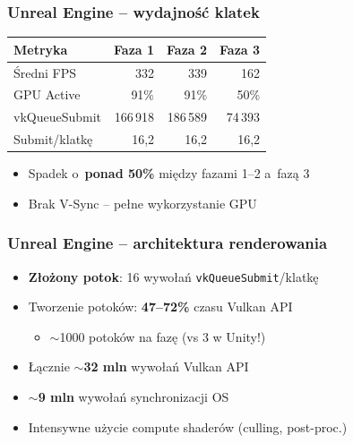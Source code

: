 \documentclass{beamer}
\begin{document}
\begin{frame}
  \frametitle{Unreal Engine -- wydajność klatek}
  \begin{table}
    \centering
    \small
    \begin{tabular}{lrrr}
      \toprule
      \textbf{Metryka} & \textbf{Faza 1} & \textbf{Faza 2} & \textbf{Faza 3} \\
      \midrule
      Średni FPS & 332 & 339 & 162  \\
      GPU Active & 91\% & 91\% & 50\% \\
      vkQueueSubmit & 166\,918 & 186\,589 & 74\,393 \\
      Submit/klatkę & 16,2 & 16,2 & 16,2  \\
      \bottomrule
    \end{tabular}
  \end{table}
  \vspace{0.3cm}
  \begin{itemize}
    \item Spadek o~\textbf{ponad 50\%} między fazami 1--2 a~fazą 3
    \item Brak V-Sync -- pełne wykorzystanie GPU
  \end{itemize}
\end{frame}

\begin{frame}
  \frametitle{Unreal Engine -- architektura renderowania}
  \small
  \begin{itemize}
    \item \textbf{Złożony potok}: 16 wywołań \texttt{vkQueueSubmit}/klatkę
    \item Tworzenie potoków: \textbf{47--72\%} czasu Vulkan API
    \begin{itemize}
      \item $\sim$1000 potoków na fazę (vs 3 w Unity!)
    \end{itemize}
    \item Łącznie $\sim$\textbf{32 mln} wywołań Vulkan API
    \item $\sim$\textbf{9 mln} wywołań synchronizacji OS
    \item Intensywne użycie compute shaderów (culling, post-proc.)
  \end{itemize}
\end{frame}
\end{document}
